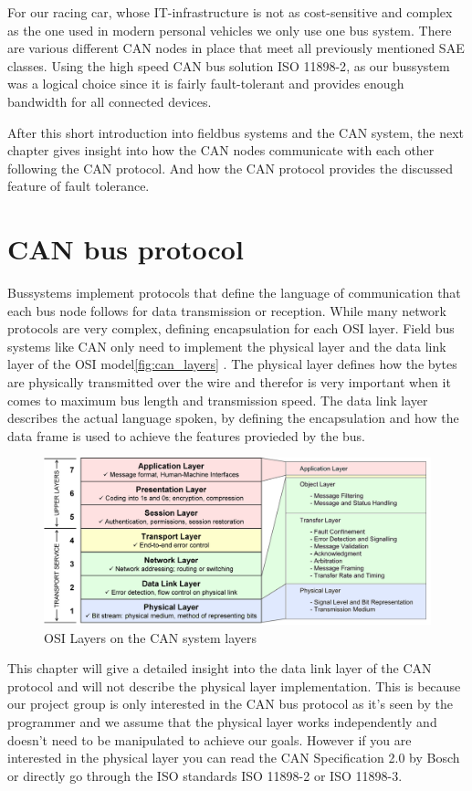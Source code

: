 	For our racing car, whose IT-infrastructure is not as cost-sensitive and
	complex as the one used in modern personal vehicles we only use one bus system.
	There are various different CAN nodes in place that meet all previously
	mentioned SAE classes. Using the high speed CAN bus solution ISO
	11898-2\cite{iso11898-2}, as our bussystem was a logical choice since it is
	fairly fault-tolerant and provides enough bandwidth for all connected devices.
	
	After this short introduction into fieldbus systems and the CAN system, the
	next chapter gives insight into how the CAN nodes communicate with each other
	following the CAN protocol. And how the CAN protocol provides the discussed
	feature of fault tolerance.
	

\section{CAN bus protocol}
Bussystems implement protocols that define the language of communication that
each bus node follows for data transmission or reception.
While many network protocols are very complex, defining encapsulation for each
OSI layer.
Field bus systems like CAN only need to implement the physical layer and the
data link layer of the OSI model\autoref{fig:can_layers} . The physical layer
defines how the bytes are physically transmitted over the wire and therefor is very important when it
comes to maximum bus length and transmission speed. The data link layer
describes the actual language spoken, by defining the encapsulation and how the
data frame is used to achieve the features provieded by the bus. 

\begin{figure}[htb] \centering
	\includegraphics[width=1\textwidth]{content/pictures/OSI_CAN}
	\caption{OSI Layers on the CAN system layers}
	\label{fig:can_layers}
\end{figure}

This chapter will give a detailed insight into the data link layer of the CAN
protocol and will not describe the physical layer implementation. This is
because our project group is only interested in the CAN bus protocol as it's
seen by the programmer and we assume that the physical layer works independently
and doesn't need to be manipulated to achieve our goals. However if you are
interested in the physical layer you can read the CAN Specification
2.0\cite{can2spec} by Bosch or directly go through the ISO standards ISO 11898-2\cite{iso11898-2} or ISO
11898-3\cite{iso11898-3}.


